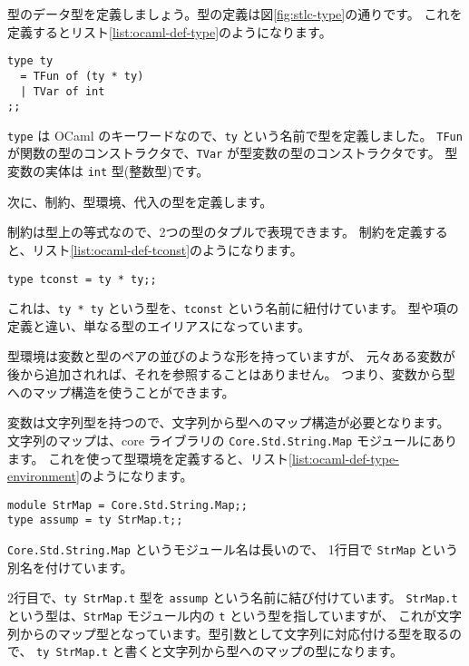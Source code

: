 型のデータ型を定義しましょう。型の定義は図\ref{fig:stlc-type}の通りです。
これを定義するとリスト\ref{list:ocaml-def-type}のようになります。

\begin{lstlisting}[caption=型の定義, label=list:ocaml-def-type]
type ty
  = TFun of (ty * ty)
  | TVar of int
;;
\end{lstlisting}

\texttt{type} は OCaml のキーワードなので、\texttt{ty} という名前で型を定義しました。
\texttt{TFun} が関数の型のコンストラクタで、\texttt{TVar} が型変数の型のコンストラクタです。
型変数の実体は \texttt{int} 型(整数型)です。

次に、制約、型環境、代入の型を定義します。

制約は型上の等式なので、2つの型のタプルで表現できます。
制約を定義すると、リスト\ref{list:ocaml-def-tconst}のようになります。

\begin{lstlisting}[caption=制約の定義, label=list:ocaml-def-tconst]
type tconst = ty * ty;;
\end{lstlisting}

これは、\texttt{ty * ty} という型を、\texttt{tconst} という名前に紐付けています。
型や項の定義と違い、単なる型のエイリアスになっています。

型環境は変数と型のペアの並びのような形を持っていますが、
元々ある変数が後から追加されれば、それを参照することはありません。
つまり、変数から型へのマップ構造を使うことができます。

変数は文字列型を持つので、文字列から型へのマップ構造が必要となります。
文字列のマップは、core ライブラリの \texttt{Core.Std.String.Map} モジュールにあります。
これを使って型環境を定義すると、リスト\ref{list:ocaml-def-type-environment}のようになります。

\begin{lstlisting}[caption=型環境の定義, label=list:ocaml-def-type-environment]
module StrMap = Core.Std.String.Map;;
type assump = ty StrMap.t;;
\end{lstlisting}

\texttt{Core.Std.String.Map} というモジュール名は長いので、
1行目で \texttt{StrMap} という別名を付けています。

2行目で、\texttt{ty StrMap.t} 型を \texttt{assump} という名前に結び付けています。
\texttt{StrMap.t} という型は、\texttt{StrMap} モジュール内の \texttt{t} という型を指していますが、
これが文字列からのマップ型となっています。型引数として文字列に対応付ける型を取るので、
\texttt{ty StrMap.t} と書くと文字列から型へのマップの型になります。

